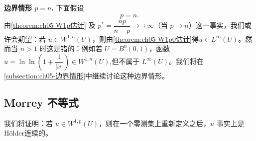 \documentclass[../../main.tex]{subfiles}
\begin{document}
\begin{remark}
\textbf{边界情形 $p=n$.} 下面假设
\begin{align*}
p=n.
\end{align*}
由\cref{theorem:ch05-W1p估计} 及 $p^{*}=\dfrac{np}{n-p}\to+\infty$（当 $p\to n$）这一事实，我们或许会期望：若 $u\in W^{1,n}(U)$，则由\cref{theorem:ch05-W1p0估计}得$u\in L^{\infty}(U)$。然而当 $n>1$ 时这是错的：例如若 $U=B^{0}(0,1)$，函数 $u=\ln\ln\left(1+\dfrac{1}{|x|}\right)\in W^{1,n}(U)$,但不属于 $L^{\infty}(U)$。我们将在\cref{subsection:ch05-边界情形}中继续讨论这种边界情形。
\end{remark}


\subsection{Morrey 不等式}\label{subsection:ch05-Morrey}

我们将证明：若 $u\in W^{1,p}(U)$，则在一个零测集上重新定义之后，$u$ 事实上是H\"older连续的。
\end{document}
